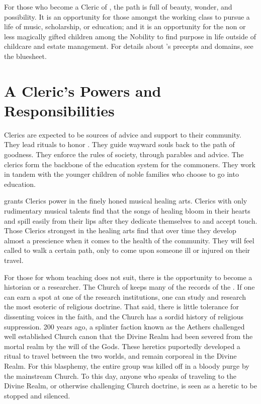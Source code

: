 \documentclass[blue]{GL2020}
\begin{document}
\name{\bCoSCleric{}}

For those who become a Cleric of \cFarmGod{}, the path is full of beauty, wonder, and possibility.  It is an opportunity for those amongst the working class to pursue a life of music, scholarship, or education; and it is an opportunity for the non or less magically gifted children among the Nobility to find purpose in life outside of childcare and estate management.  For details about \cFarmGod{}'s precepts and domains, see the \pFarm{} bluesheet.

\section{A Cleric's Powers and Responsibilities}
Clerics are expected to be sources of advice and support to their community.  They lead rituals to honor \cFarmGod{}.  They guide wayward souls back to the path of goodness.  They enforce the rules of society, through parables and advice.  The clerics form the backbone of the \pFarm{} education system for the commoners.  They work in tandem with the younger children of noble families who choose to go into education.  

\cFarmGod{} grants \cFarmGod{\their} Clerics power in the finely honed musical healing arts.  \pFarm{} Clerics with only rudimentary musical talents find that the songs of healing bloom in their hearts and spill easily from their lips after they dedicate themselves to \cFarmGod{} and accept \cFarmGod{\their} touch.  Those Clerics strongest in the healing arts find that over time they develop almost a prescience when it comes to the health of the community.  They will feel called to walk a certain path, only to come upon someone ill or injured on their travel.

For those for whom teaching does not suit, there is the opportunity to become a historian or a researcher.  The Church of \cFarmGod{} keeps many of the records of the \pFarm{}.  If one can earn a spot at one of the research institutions, one can study and research the most esoteric of religious doctrine.  That said, there is little tolerance for dissenting voices in the faith, and the Church has a sordid history of religious suppression.  200 years ago, a splinter faction known as the Aethers challenged well established Church canon that the Divine Realm had been severed from the mortal realm by the will of the Gods.  These heretics puportedly developed a ritual to travel between the two worlds, and remain corporeal in the Divine Realm.  For this blasphemy, the entire group was killed off in a bloody purge by the mainstream Church.  To this day, anyone who speaks of traveling to the Divine Realm, or otherwise challenging Church doctrine, is seen as a heretic to be stopped and silenced.
\end{document}
